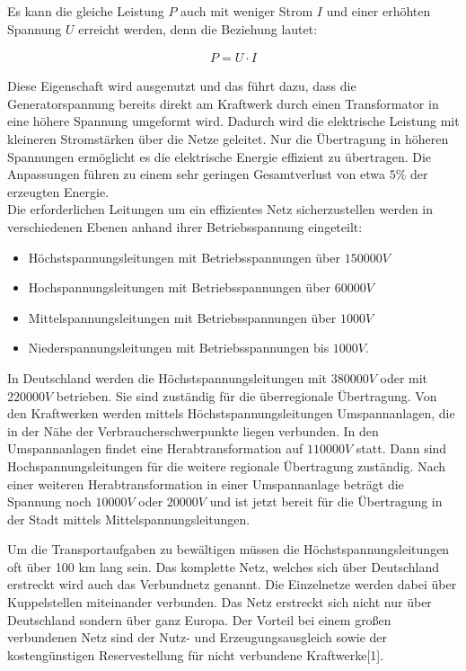 Es kann die gleiche Leistung $P$ auch mit weniger Strom $I$ und einer erhöhten Spannung $U$ erreicht werden, denn die Beziehung lautet:

\begin{align}
	P = U \cdot I
\end{align}  

Diese Eigenschaft wird ausgenutzt und das führt dazu, dass die Generatorspannung bereits direkt am Kraftwerk durch einen Transformator in eine höhere Spannung umgeformt wird. Dadurch wird die elektrische Leistung mit kleineren Stromstärken über die Netze geleitet. Nur die Übertragung in höheren Spannungen ermöglicht es die elektrische Energie effizient zu übertragen. Die Anpassungen führen zu einem sehr geringen Gesamtverlust von etwa $5\%$ der erzeugten Energie. \\

Die erforderlichen Leitungen um ein effizientes Netz sicherzustellen werden in verschiedenen Ebenen anhand ihrer Betriebsspannung eingeteilt:
\begin{itemize}
	\item Höchstspannungsleitungen mit Betriebsspannungen über $150000V$
	\item Hochspannungsleitungen mit Betriebsspannungen über $60000V$
	\item Mittelspannungsleitungen mit Betriebsspannungen über $1000V$
	\item Niederspannungsleitungen mit Betriebsspannungen bis $1000V$.
\end{itemize} 

In Deutschland werden die Höchstspannungsleitungen mit $380 000V$ oder mit $220 000V$ betrieben. Sie sind zuständig für die überregionale Übertragung. Von den Kraftwerken werden mittels Höchstspannungsleitungen Umspannanlagen, die in der Nähe der Verbraucherschwerpunkte liegen verbunden. In den Umspannanlagen findet eine Herabtransformation auf $110 000V$ statt. Dann sind Hochspannungsleitungen für die weitere regionale Übertragung zuständig. Nach einer weiteren Herabtransformation in einer Umspannanlage beträgt die Spannung noch $10 000V$ oder $20 000V$ und ist jetzt bereit für die Übertragung in der Stadt mittels Mittelspannungsleitungen.

Um die Transportaufgaben zu bewältigen müssen die Höchstspannungsleitungen oft über 100 km lang sein. Das komplette Netz, welches sich über Deutschland erstreckt wird auch das Verbundnetz genannt. Die Einzelnetze werden dabei über Kuppelstellen miteinander verbunden. Das Netz erstreckt sich nicht nur über Deutschland sondern über ganz Europa. Der Vorteil bei einem großen verbundenen Netz sind der Nutz- und Erzeugungsausgleich sowie der kostengünstigen Reservestellung für nicht verbundene Kraftwerke[1].

